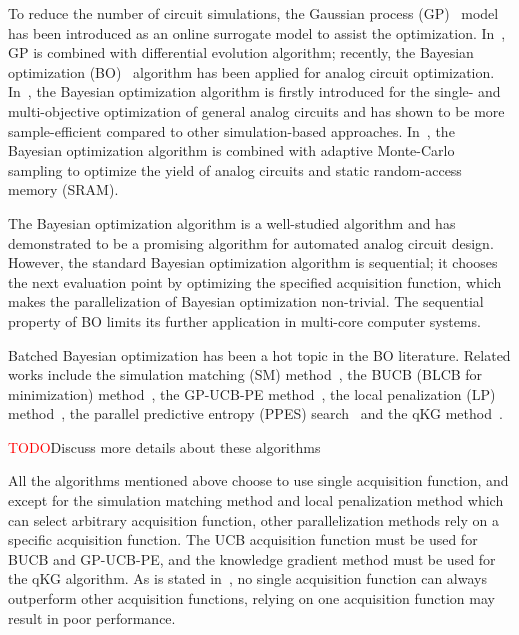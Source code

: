 %
To reduce the number of circuit simulations, the Gaussian process
(GP)~\cite{GPML} model has been introduced as an online surrogate model to
assist the optimization. In~\cite{liu2014gaspad}, GP is combined with
differential evolution algorithm; recently, the
Bayesian optimization (BO)~\cite{shahriari2016taking} algorithm has been
applied for analog circuit optimization. In~\cite{lyu2017efficient}, the Bayesian optimization algorithm is
firstly introduced for the single- and multi-objective optimization of general analog circuits and has
shown to be more sample-efficient compared to other simulation-based
approaches. In~\cite{wang2017efficient}, the Bayesian optimization algorithm
is combined with adaptive Monte-Carlo sampling to optimize the yield of analog
circuits and static random-access memory (SRAM).

The Bayesian optimization algorithm is a well-studied algorithm and has
demonstrated to be a promising algorithm for automated analog circuit design.
However, the standard Bayesian optimization algorithm is sequential; it chooses
the next evaluation point by optimizing the specified acquisition function,
which makes the parallelization of Bayesian optimization non-trivial. The
sequential property of BO limits its further application in multi-core computer
systems.

Batched Bayesian optimization has been a hot topic in the BO literature.
Related works include the simulation matching (SM)
method~\cite{azimi2010batch}, the BUCB (BLCB for minimization)
method~\cite{desautels2014parallelizing}, the GP-UCB-PE
method~\cite{contal2013parallel}, the local penalization (LP)
method~\cite{gonzalez2016batch}, the parallel predictive entropy (PPES)
search~\cite{shah2015parallel} and the qKG method~\cite{wu2016parallel}.

\textcolor{red}{TODO}{Discuss more details about these algorithms}


All the algorithms mentioned above choose to use single acquisition function,
and except for the simulation matching method and local penalization method
which can select arbitrary acquisition function, other parallelization methods
rely on a specific acquisition function. The UCB acquisition function must be
used for BUCB and GP-UCB-PE, and the knowledge gradient method must be used for
the qKG algorithm. As is stated in~\cite{hoffman2011portfolio}, no single
acquisition function can always outperform other acquisition functions, relying
on one acquisition function may result in poor performance. 

